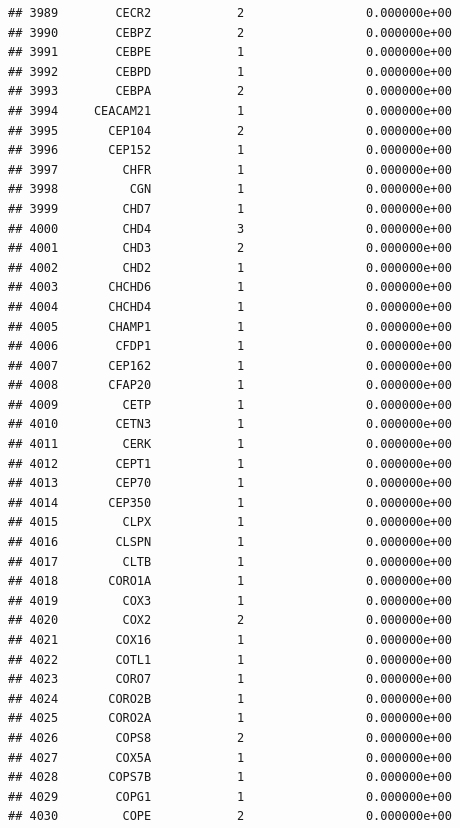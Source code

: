 \documentclass[
]{article}
\begin{document}
\begin{verbatim}
## 3989        CECR2            2                 0.000000e+00
## 3990        CEBPZ            2                 0.000000e+00
## 3991        CEBPE            1                 0.000000e+00
## 3992        CEBPD            1                 0.000000e+00
## 3993        CEBPA            2                 0.000000e+00
## 3994     CEACAM21            1                 0.000000e+00
## 3995       CEP104            2                 0.000000e+00
## 3996       CEP152            1                 0.000000e+00
## 3997         CHFR            1                 0.000000e+00
## 3998          CGN            1                 0.000000e+00
## 3999         CHD7            1                 0.000000e+00
## 4000         CHD4            3                 0.000000e+00
## 4001         CHD3            2                 0.000000e+00
## 4002         CHD2            1                 0.000000e+00
## 4003       CHCHD6            1                 0.000000e+00
## 4004       CHCHD4            1                 0.000000e+00
## 4005       CHAMP1            1                 0.000000e+00
## 4006        CFDP1            1                 0.000000e+00
## 4007       CEP162            1                 0.000000e+00
## 4008       CFAP20            1                 0.000000e+00
## 4009         CETP            1                 0.000000e+00
## 4010        CETN3            1                 0.000000e+00
## 4011         CERK            1                 0.000000e+00
## 4012        CEPT1            1                 0.000000e+00
## 4013        CEP70            1                 0.000000e+00
## 4014       CEP350            1                 0.000000e+00
## 4015         CLPX            1                 0.000000e+00
## 4016        CLSPN            1                 0.000000e+00
## 4017         CLTB            1                 0.000000e+00
## 4018       CORO1A            1                 0.000000e+00
## 4019         COX3            1                 0.000000e+00
## 4020         COX2            2                 0.000000e+00
## 4021        COX16            1                 0.000000e+00
## 4022        COTL1            1                 0.000000e+00
## 4023        CORO7            1                 0.000000e+00
## 4024       CORO2B            1                 0.000000e+00
## 4025       CORO2A            1                 0.000000e+00
## 4026        COPS8            2                 0.000000e+00
## 4027        COX5A            1                 0.000000e+00
## 4028       COPS7B            1                 0.000000e+00
## 4029        COPG1            1                 0.000000e+00
## 4030         COPE            2                 0.000000e+00

\end{verbatim}
\end{document}
